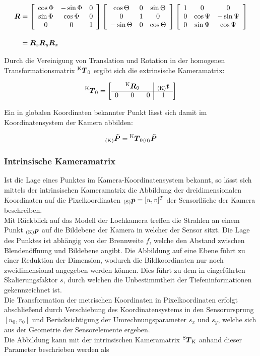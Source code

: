 \begin{equation}
\begin{split}
\vec{R} & = \matz{\Phi} \maty{\Theta} \matx{\Psi} \\[1em]
& = \vec{R}_z \vec{R}_y \vec{R}_x
\end{split}
\end{equation}

Durch die Vereinigung von Translation und Rotation in der homogenen Transformationsmatrix $\tmat{K}{0}$ ergibt sich die extrinsische Kameramatrix:

\begin{equation}
\tmat{K}{0} = 
\mat{ccc|c}{
  & \rmat{K}{0} &   & \ve{K}{t} \\
\hline
0 &      0      & 0 & 1 \\
}
\end{equation}

Ein in globalen Koordinaten bekannter Punkt lässt sich damit im Koordinatensystem der Kamera abbilden:

\begin{equation}
\ve{K}{\tilde{P}} = \tmat{K}{0}\ve{0}{\tilde{P}}
\end{equation}


\subsubsection{Intrinsische Kameramatrix}
Ist die Lage eines Punktes im Kamera-Koordinatensystem bekannt, so lässt sich mittels der intrinsischen Kameramatrix die Abbildung der dreidimensionalen Koordinaten auf die Pixelkoordinaten $\ve{S}{p} = [u,v]^T$ der Sensorfläche der Kamera beschreiben.\\
Mit Rückblick auf das Modell der Lochkamera treffen die Strahlen an einem Punkt $\ve{K}{{p}}$ auf die Bildebene der Kamera in welcher der Sensor sitzt. Die Lage des Punktes ist abhängig von der Brennweite $f$, welche den Abstand zwischen Blendenöffnung und Bildebene angibt. Die Abbildung auf eine Ebene führt zu einer Reduktion der Dimension, wodurch die Bildkoordinaten nur noch zweidimensional angegeben werden können. Dies führt zu dem in  eingeführten Skalierungsfaktor $s$, durch welchen die Unbestimmtheit der Tiefeninformationen gekennzeichnet ist.\\

Die Transformation der metrischen Koordinaten in Pixelkoordinaten erfolgt abschließend durch Verschiebung des Koordinatensystems in den Sensorursprung $[u_0,v_0]$ und Berücksichtigung der Umrechnungsparameter $s_x$ und $s_y$, welche sich aus der Geometrie der Sensorelemente ergeben. \\
Die Abbildung kann mit der intrinsischen Kameramatrix $\tmat{S}{K}$ anhand dieser Parameter beschrieben werden als

